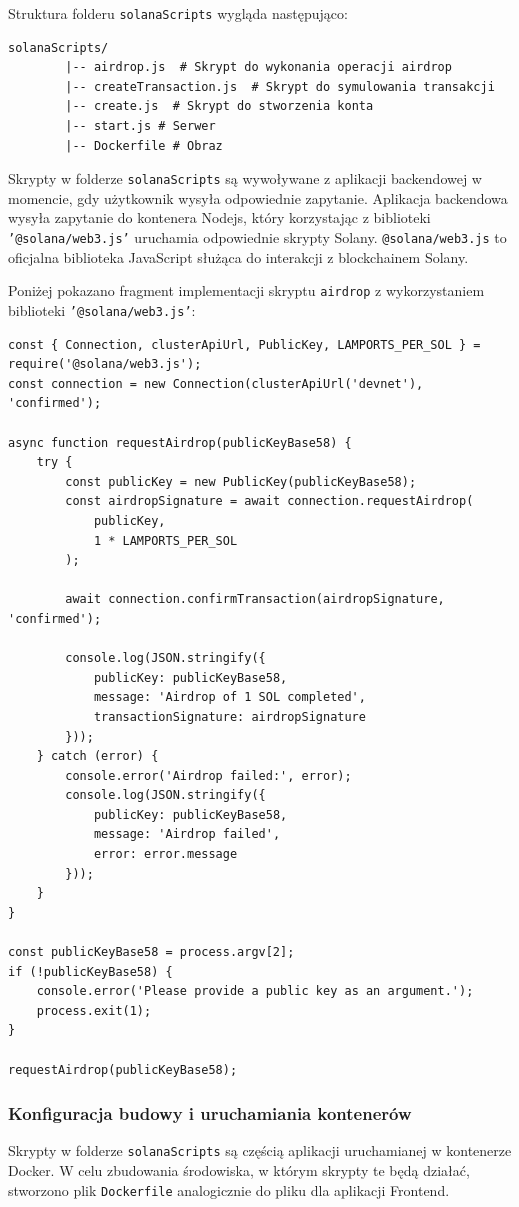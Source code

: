 Struktura folderu \texttt{solanaScripts} wygląda następująco:
\begin{lstlisting}[basicstyle=\footnotesize\ttfamily,tabsize=4]
solanaScripts/
		|-- airdrop.js  # Skrypt do wykonania operacji airdrop
		|-- createTransaction.js  # Skrypt do symulowania transakcji
		|-- create.js  # Skrypt do stworzenia konta
		|-- start.js # Serwer
		|-- Dockerfile # Obraz 
\end{lstlisting}

Skrypty w folderze \texttt{solanaScripts} są wywoływane z aplikacji backendowej w momencie, gdy użytkownik wysyła odpowiednie zapytanie. Aplikacja backendowa wysyła zapytanie do kontenera Nodejs, który korzystając z biblioteki \texttt{'@solana/web3.js'} uruchamia odpowiednie skrypty Solany. \texttt{@solana/web3.js} to oficjalna biblioteka JavaScript służąca do interakcji z blockchainem Solany.  

Poniżej pokazano fragment implementacji skryptu \texttt{airdrop} z wykorzystaniem biblioteki \texttt{'@solana/web3.js'}:
\begin{lstlisting}[style=JavaScriptStyle]
const { Connection, clusterApiUrl, PublicKey, LAMPORTS_PER_SOL } = require('@solana/web3.js');
const connection = new Connection(clusterApiUrl('devnet'), 'confirmed');

async function requestAirdrop(publicKeyBase58) {
    try {
        const publicKey = new PublicKey(publicKeyBase58);
        const airdropSignature = await connection.requestAirdrop(
            publicKey,
            1 * LAMPORTS_PER_SOL
        );

        await connection.confirmTransaction(airdropSignature, 'confirmed');

        console.log(JSON.stringify({
            publicKey: publicKeyBase58,
            message: 'Airdrop of 1 SOL completed',
            transactionSignature: airdropSignature
        }));
    } catch (error) {
        console.error('Airdrop failed:', error);
        console.log(JSON.stringify({
            publicKey: publicKeyBase58,
            message: 'Airdrop failed',
            error: error.message
        }));
    }
}

const publicKeyBase58 = process.argv[2];
if (!publicKeyBase58) {
    console.error('Please provide a public key as an argument.');
    process.exit(1);
}

requestAirdrop(publicKeyBase58);
\end{lstlisting}


\subsubsection{Konfiguracja budowy i uruchamiania kontenerów}
Skrypty w folderze \texttt{solanaScripts} są częścią aplikacji uruchamianej w kontenerze Docker. W celu zbudowania środowiska, w którym skrypty te będą działać, stworzono plik \texttt{Dockerfile} analogicznie do pliku dla aplikacji Frontend. 

